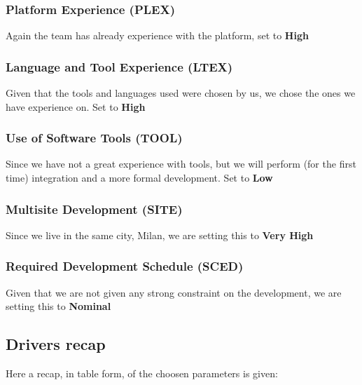 \subsubsection{Platform Experience (PLEX)}
Again the team has already experience with the platform, set to \textbf{High}
\subsubsection{Language and Tool Experience (LTEX)}
Given that the tools and languages used were chosen by us, we chose the ones we have experience on. Set to \textbf{High}
\subsubsection{Use of Software Tools (TOOL)}
Since we have not a great experience with tools, but we will perform (for the first time) integration and a more formal development. Set to \textbf{Low}
\subsubsection{Multisite Development (SITE)}
Since we live in the same city, Milan, we are setting this to \textbf{Very High}
\subsubsection{Required Development Schedule (SCED)}
Given that we are not given any strong constraint on the development, we are setting this to \textbf{Nominal}
\clearpage
\subsection{Drivers recap}
Here a recap, in table form, of the choosen parameters is given: 


